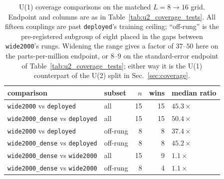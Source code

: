 \documentclass[prd, twocolumn, superscriptaddress, nofootinbib,floatfix]{revtex4-2}
\DeclareRobustCommand{\sect}[1]{Sec.~\ref{sec:#1}}
\DeclareRobustCommand{\tb}[1]{Table~\ref{tab:#1}}
\begin{document}
\begin{table}[htbp]
\centering
\small
\caption{U(1) coverage comparisons on the matched $L{=}8\to16$ grid. Endpoint
and columns are as in \tb{u2_coverage_tests}. All fifteen couplings are past
\texttt{deployed}'s training ceiling; ``off-rung'' is the pre-registered
subgroup of eight placed in the gaps between \texttt{wide2000}'s rungs.
Widening the range gives a factor of $37$--$50$ here on the parts-per-million
endpoint, or $8$--$9$ on the standard-error endpoint of
\tb{u2_coverage_tests}; either way it is the U(1) counterpart of the U(2) split
in \sect{coverage}.}
\label{tab:u1_coverage_tests}
\begin{tabular}{llrrl}
\toprule
comparison & subset & $n$ & wins & median ratio \\
\midrule
\texttt{wide2000} vs \texttt{deployed} & all & 15 & 15 & $45.3\times$ \\
\texttt{wide2000\_dense} vs \texttt{deployed} & all & 15 & 15 & $50.4\times$ \\
\texttt{wide2000} vs \texttt{deployed} & off-rung & 8 & 8 & $37.4\times$ \\
\texttt{wide2000\_dense} vs \texttt{deployed} & off-rung & 8 & 8 & $45.2\times$ \\
\addlinespace
\texttt{wide2000\_dense} vs \texttt{wide2000} & all & 15 & 9 & $1.1\times$ \\
\texttt{wide2000\_dense} vs \texttt{wide2000} & off-rung & 8 & 4 & $1.1\times$ \\
\bottomrule
\end{tabular}
\end{table}
\end{document}
